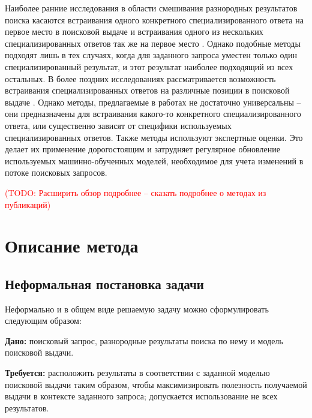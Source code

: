 \documentclass[12pt,a4paper]{report}
\newcommand\note[1]{\textcolor{red}{(#1)}}
\newcommand\todonote[1]{\note{TODO: #1}}
\begin{document}
Наиболее ранние исследования в области смешивания разнородных результатов поиска касаются встраивания одного конкретного специализированного ответа на первое место в поисковой выдаче \cite{Diaz-News, Konig, Li} и встраивания одного из нескольких специализированных ответов так же на первое место \cite{Arguello-VerticalSelection2009, Arguello-VerticalSelection2010, DiazArguello-VerticalSelection}. Однако подобные методы подходят лишь в тех случаях, когда для заданного запроса уместен только один специализированный результат, и этот результат наиболее подходящий из всех остальных. В более поздних исследованиях рассматривается возможность встраивания специализированных ответов на различные позиции в поисковой выдаче \cite{Lefortier-YandexVideo, Ponnuswami, Arguello-CIKM11, Jie-YahooFederationSystem}. 
Однако методы, предлагаемые в работах \cite{Lefortier-YandexVideo, Ponnuswami, Arguello-CIKM11} не достаточно универсальны -- они предназначены для встраивания какого-то конкретного специализированного ответа, или существенно зависят от специфики используемых специализированных ответов.
Также методы \cite{Ponnuswami, Arguello-CIKM11} используют экспертные оценки. Это делает их применение дорогостоящим и затрудняет регулярное обновление используемых машинно-обученных моделей, необходимое для учета изменений в потоке поисковых запросов.

\todonote{Расширить обзор подробнее -- сказать подробнее о методах из публикаций}


\chapter{Описание метода} 
\label{ch:method-descriptions}

\section{Неформальная постановка задачи}
\label{sec:task-informal}

Неформально и в общем виде решаемую задачу можно сформулировать следующим образом:

\vspace{3mm}
\textbf{Дано:} поисковый запрос, разнородные результаты поиска по нему и модель поисковой выдачи.

\textbf{Требуется:} расположить результаты в соответствии с заданной моделью поисковой выдачи таким образом, чтобы максимизировать полезность получаемой выдачи в контексте заданного запроса; допускается использование не всех результатов.
\vspace{3mm}
\end{document}
